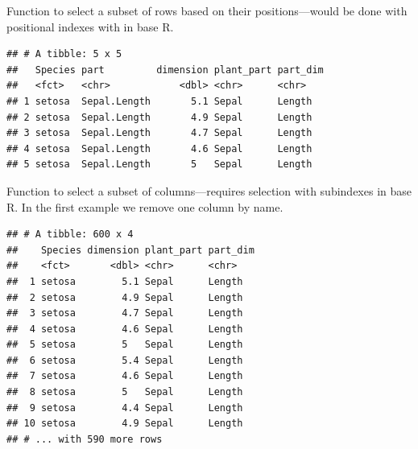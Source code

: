 \documentclass[krantz2]{krantz}\usepackage{knitr}%
\begin{document}
Function  to select a subset of rows based on their positions---would be done with positional indexes with \code{[ , ]} in base R.

\begin{knitrout}\footnotesize
{}\color{fgcolor}\begin{kframe}
\begin{alltt}
 \hlopt{:}\hlstd{)}
\end{alltt}
\begin{verbatim}
## # A tibble: 5 x 5
##   Species part         dimension plant_part part_dim
##   <fct>   <chr>            <dbl> <chr>      <chr>   
## 1 setosa  Sepal.Length       5.1 Sepal      Length  
## 2 setosa  Sepal.Length       4.9 Sepal      Length  
## 3 setosa  Sepal.Length       4.7 Sepal      Length  
## 4 setosa  Sepal.Length       4.6 Sepal      Length  
## 5 setosa  Sepal.Length       5   Sepal      Length
\end{verbatim}
\end{kframe}
\end{knitrout}

Function  to select a subset of columns---requires selection with subindexes in base R. In the first example we remove one column by name.

\begin{knitrout}\footnotesize
{}\color{fgcolor}\begin{kframe}
\begin{alltt}
 \hlopt{-}
\end{alltt}
\begin{verbatim}
## # A tibble: 600 x 4
##    Species dimension plant_part part_dim
##    <fct>       <dbl> <chr>      <chr>   
##  1 setosa        5.1 Sepal      Length  
##  2 setosa        4.9 Sepal      Length  
##  3 setosa        4.7 Sepal      Length  
##  4 setosa        4.6 Sepal      Length  
##  5 setosa        5   Sepal      Length  
##  6 setosa        5.4 Sepal      Length  
##  7 setosa        4.6 Sepal      Length  
##  8 setosa        5   Sepal      Length  
##  9 setosa        4.4 Sepal      Length  
## 10 setosa        4.9 Sepal      Length  
## # ... with 590 more rows
\end{verbatim}
\end{kframe}
\end{knitrout}
\end{document}
